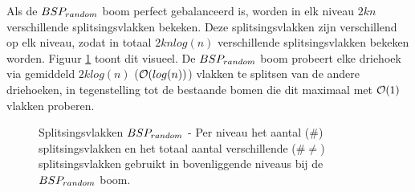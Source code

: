 Als de $\symBSPrandom$ boom perfect gebalanceerd is, worden in elk niveau $2kn$ verschillende splitsingsvlakken bekeken.
Deze splitsingsvlakken zijn verschillend op elk niveau, zodat in totaal $2knlog(n)$ verschillende splitsingsvlakken bekeken worden.
Figuur \ref{fig:splitsingsvlakken-bsprandom} toont dit visueel.
De $\symBSPrandom$ boom probeert elke driehoek via gemiddeld $2klog(n)$ ($\mathcal{O}(log(n))$) vlakken te splitsen van de andere driehoeken, in tegenstelling tot de bestaande bomen die dit maximaal met $\mathcal{O}(1)$ vlakken proberen.\\

\begin{figure}
    \centering

   \caption[Splitsingsvlakken $\symBSPrandom$]%
    {Splitsingsvlakken $\symBSPrandom$ - \small Per niveau het aantal ($\#$) splitsingsvlakken en het totaal aantal verschillende ($\# \neq$) splitsingsvlakken gebruikt in bovenliggende niveaus bij de $\symBSPrandom$ boom.} %
    \label{fig:splitsingsvlakken-bsprandom}
\end{figure}

